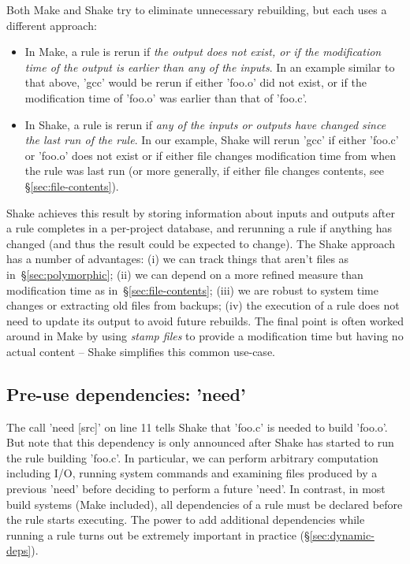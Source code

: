 Both Make and Shake try to eliminate unnecessary rebuilding, but each
uses a different approach:

\begin{itemize}
\item In Make, a rule is rerun if \emph{the output does not exist, or if the
modification time of the output is earlier than any of the inputs}. In an example
similar to that above, \lst'gcc' would be rerun if either \lst'foo.o' did not
exist, or if the modification time of \lst'foo.o' was earlier than that of
\lst'foo.c'.
\item In Shake, a rule is rerun if \emph{any of the inputs or outputs have changed since the
last run of the rule}. In our example, Shake will rerun \lst'gcc' if
either \lst'foo.c' or \lst'foo.o' does not exist or if either file
changes modification time from when the rule was last run (or more
generally, if either file changes contents, see
\S\ref{sec:file-contents}).
\end{itemize}
\noindent
Shake achieves this result by storing information about inputs and outputs after a rule
completes in a per-project database, and rerunning a rule if anything has
changed (and thus the result could be expected to change). The Shake approach
has a number of advantages: (i) we can track things that aren't files as
in~\S\ref{sec:polymorphic}; (ii) we can depend on a more refined measure than
modification time as in~\S\ref{sec:file-contents}; (iii) we are robust to system
time changes or extracting old files from backups; (iv) the execution of a rule
does not need to update its output to avoid future rebuilds. The final point is
often worked around in Make by using \emph{stamp files} to provide a
modification time but having no actual content -- Shake simplifies this common
use-case.

\subsection{Pre-use dependencies: \lst'need'\label{sec:need}}

The call \lst'need [src]' on line 11 tells Shake that \lst'foo.c' is needed
to build \lst'foo.o'. But note that this dependency is only announced
after Shake has started to run the rule building \lst'foo.c'.
In particular, we can perform
arbitrary computation including I/O, running system commands and examining files
produced by a previous \lst'need' before deciding to perform a future \lst'need'.
In contrast, in most build systems (Make included), all dependencies of a rule must be
declared before the rule starts executing. The power to add additional dependencies
while running a rule turns out be extremely important in practice (\S\ref{sec:dynamic-deps}).

